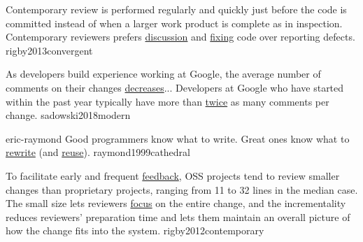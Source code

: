 \documentclass{article}
\begin{document}
  {Contemporary review is performed regularly and quickly just before the code is committed instead of when a larger work product is complete as in inspection. Contemporary reviewers prefers \ul{discussion} and \ul{fixing} code over reporting defects.}
  {rigby2013convergent}

  {As developers build experience working at Google, the average number of comments on their changes \ul{decreases}... Developers at Google who have started within the past year typically have more than \ul{twice} as many comments per change.}
  {sadowski2018modern}



\lnQuote
  {eric-raymond}
  {Good programmers know what to write. Great ones know what to \ul{rewrite} (and \ul{reuse}).}
  {raymond1999cathedral}

  {To facilitate early and frequent \ul{feedback}, OSS projects tend to review smaller changes than proprietary projects, ranging from 11 to 32 lines in the median case. The small size lets reviewers \ul{focus} on the entire change, and the incrementality reduces reviewers’ preparation time and lets them maintain an overall picture of how the change fits into the system.}
  {rigby2012contemporary}
\end{document}
